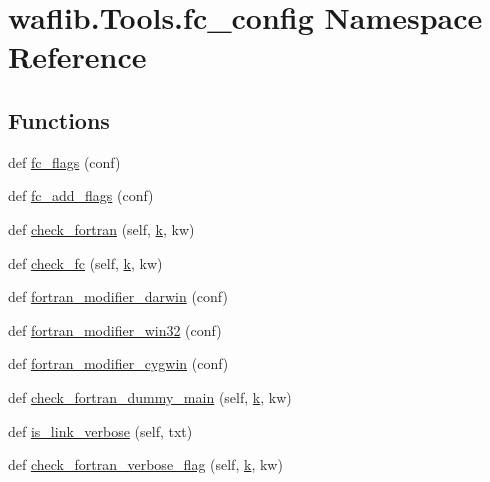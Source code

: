 \hypertarget{namespacewaflib_1_1_tools_1_1fc__config}{}\section{waflib.\+Tools.\+fc\+\_\+config Namespace Reference}
\label{namespacewaflib_1_1_tools_1_1fc__config}
\subsection*{Functions}
\begin{DoxyCompactItemize}
\item 
def \hyperlink{namespacewaflib_1_1_tools_1_1fc__config_af33dfe55223675e715096b53060fcc7b}{fc\+\_\+flags} (conf)
\item 
def \hyperlink{namespacewaflib_1_1_tools_1_1fc__config_ab8da3d423ca04bcb0605cb5b20cf1003}{fc\+\_\+add\+\_\+flags} (conf)
\item 
def \hyperlink{namespacewaflib_1_1_tools_1_1fc__config_a30df582cf9f3bd7df5e10b19cce9c1af}{check\+\_\+fortran} (self, \hyperlink{rfft2d_test_m_l_8m_adc468c70fb574ebd07287b38d0d0676d}{k}, kw)
\item 
def \hyperlink{namespacewaflib_1_1_tools_1_1fc__config_a6a20ecee9e371876b4ed84bbdf2ef5b2}{check\+\_\+fc} (self, \hyperlink{rfft2d_test_m_l_8m_adc468c70fb574ebd07287b38d0d0676d}{k}, kw)
\item 
def \hyperlink{namespacewaflib_1_1_tools_1_1fc__config_ac18fad0b284649afcff955dbda86ecfc}{fortran\+\_\+modifier\+\_\+darwin} (conf)
\item 
def \hyperlink{namespacewaflib_1_1_tools_1_1fc__config_a1ede54d90c65d29ab988d3c396f41c09}{fortran\+\_\+modifier\+\_\+win32} (conf)
\item 
def \hyperlink{namespacewaflib_1_1_tools_1_1fc__config_aa38ff3fd4c6e527bbb7694fb926be843}{fortran\+\_\+modifier\+\_\+cygwin} (conf)
\item 
def \hyperlink{namespacewaflib_1_1_tools_1_1fc__config_ad62948bfb2feb67956cd041be08f7dd8}{check\+\_\+fortran\+\_\+dummy\+\_\+main} (self, \hyperlink{rfft2d_test_m_l_8m_adc468c70fb574ebd07287b38d0d0676d}{k}, kw)
\item 
def \hyperlink{namespacewaflib_1_1_tools_1_1fc__config_a65edef95fa138e1a9780be8e33eb6bf0}{is\+\_\+link\+\_\+verbose} (self, txt)
\item 
def \hyperlink{namespacewaflib_1_1_tools_1_1fc__config_a1476da254937f14613e25a63aa40e95e}{check\+\_\+fortran\+\_\+verbose\+\_\+flag} (self, \hyperlink{rfft2d_test_m_l_8m_adc468c70fb574ebd07287b38d0d0676d}{k}, kw)

\end{DoxyCompactItemize}

